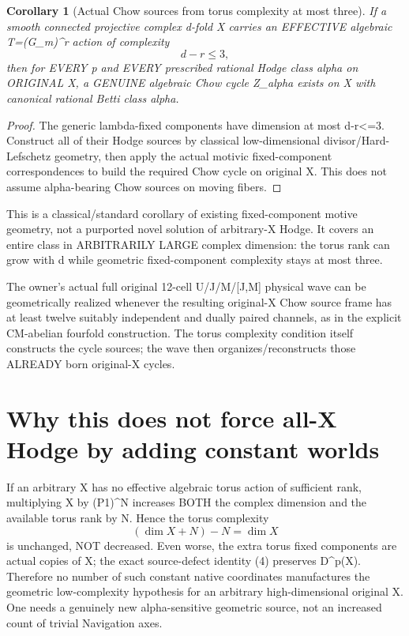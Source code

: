 \documentclass[11pt]{article}
\newtheorem{corollary}{Corollary}
\begin{document}
\begin{corollary}[Actual Chow sources from torus complexity at most three]
If a smooth connected projective complex
d-fold X carries an EFFECTIVE algebraic
T=(G_m)^r action of complexity
\[
\boxed{d-r\le3,}
\]
then for EVERY p and EVERY prescribed
rational Hodge class alpha on ORIGINAL X,
a GENUINE algebraic Chow cycle
Z_alpha exists on X with canonical
rational Betti class alpha.
\end{corollary}
\begin{proof}
The generic lambda-fixed components
have dimension at most d-r<=3.
Construct all of their Hodge
sources by classical low-dimensional
divisor/Hard-Lefschetz geometry,
then apply the actual motivic
fixed-component correspondences
to build the required Chow cycle
on original X. This does not
assume alpha-bearing Chow sources
on moving fibers.
\end{proof}
This is a classical/standard corollary
of existing fixed-component motive
geometry, not a purported novel
solution of arbitrary-X Hodge.
It covers an entire class in
ARBITRARILY LARGE complex dimension:
the torus rank can grow with d
while geometric fixed-component
complexity stays at most three.

The owner's actual full original
12-cell U/J/M/[J,M] physical wave
can be geometrically realized
whenever the resulting original-X
Chow source frame has at least
twelve suitably independent and
dually paired channels, as in
the explicit CM-abelian fourfold
construction. The torus complexity
condition itself constructs the
cycle sources; the wave then
organizes/reconstructs those
ALREADY born original-X cycles.

\section{Why this does not force all-X Hodge by adding constant worlds}
If an arbitrary X has no effective
algebraic torus action of sufficient
rank, multiplying X by (P1)^N
increases BOTH the complex dimension
and the available torus rank by N.
Hence the torus complexity
\[
(\dim X+N)-N=\dim X
\]
is unchanged, NOT decreased.
Even worse, the extra torus
fixed components are actual
copies of X; the exact source-defect
identity (4) preserves D^p(X).
Therefore no number of such constant
native coordinates manufactures
the geometric low-complexity
hypothesis for an arbitrary
high-dimensional original X.
One needs a genuinely new
alpha-sensitive geometric
source, not an increased
count of trivial Navigation axes.
\end{document}
